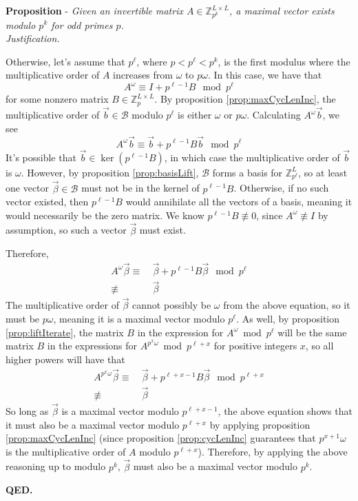 \documentclass[a4paper, 12pt, reqno]{amsart}
\newcounter{propcounter}
\newenvironment{proposition}[1]
{
	\refstepcounter{propcounter}
	\textbf{Proposition \thepropcounter} - \emph{#1} \\
	\emph{Justification.}
}
{
	\textbf{QED.} \\
}
\begin{document}
\begin{proposition}{Given an invertible matrix $A \in \mathds{Z}_{p^k}^{L \times L}$, a maximal vector exists modulo $p^k$ for odd primes $p$.}
			Otherwise, let's assume that $p^\ell$, where $p < p^\ell < p^k$, is the first modulus where the multiplicative order of $A$ increases from $\omega$ to 
			$p\omega$. In this case, we have that
			\[
				A^\omega \equiv I + p^{\ell-1}B \mod{p^\ell}
			\]
			for some nonzero matrix $B \in \mathds{Z}_p^{L \times L}$. By proposition \ref{prop:maxCycLenInc}, the multiplicative order of $\vec{b} \in \mathcal{B}$ modulo 
			$p^\ell$ is either $\omega$ or $p\omega$. Calculating $A^\omega\vec{b}$, we see
			\[
				A^\omega\vec{b} \equiv \vec{b} + p^{\ell-1}B\vec{b} \mod{p^\ell}
			\]
			It's possible that $\vec{b} \in \ker{(p^{\ell-1}B)}$, in which case the multiplicative order of $\vec{b}$ is $\omega$. However, by proposition 
			\ref{prop:basisLift}, $\mathcal{B}$ forms a basis for $\mathds{Z}_{p^\ell}^L$, so at least one vector $\vec{\beta} \in \mathcal{B}$ must not be in the kernel of $p^{\ell-1}B$. Otherwise, if no such vector 
			existed, then $p^{\ell-1}B$ would annihilate all the vectors of a basis, meaning it would necessarily be the zero matrix. We know $p^{\ell-1}B \not\equiv 0$, 
			since $A^\omega \not\equiv I$ by assumption, so such a vector $\vec{\beta}$ must exist.
			
			Therefore,
			\begin{align*}
				A^\omega\vec{\beta} \equiv& \ \vec{\beta} + p^{\ell-1}B\vec{\beta} \mod{p^\ell} \\
				                \not\equiv& \ \vec{\beta}
			\end{align*}
			The multiplicative order of $\vec{\beta}$ cannot possibly be $\omega$ from the above equation, so it must be $p\omega$, meaning it is a maximal vector modulo 
			$p^\ell$. As well, by proposition \ref{prop:liftIterate}, the matrix $B$ in the expression for $A^\omega \bmod{p^\ell}$ will be the same matrix $B$ in the 
			expressions for $A^{p^x\omega} \bmod{p^{\ell+x}}$ for positive integers $x$, so all higher powers will have that
			\begin{align*}
				A^{p^x\omega}\vec{\beta} \equiv& \ \vec{\beta} + p^{\ell+x-1}B\vec{\beta} \mod{p^{\ell+x}} \\
				                     \not\equiv& \ \vec{\beta}
			\end{align*}
			So long as $\vec{\beta}$ is a maximal vector modulo $p^{\ell+x-1}$, the above equation shows that it must also be a maximal vector modulo $p^{\ell+x}$ by 
			applying proposition \ref{prop:maxCycLenInc} (since proposition \ref{prop:cycLenInc} guarantees that $p^{x+1}\omega$ is the multiplicative order of $A$ modulo 
			$p^{\ell+x}$). Therefore, by applying the above reasoning up to modulo $p^k$, $\vec{\beta}$ must also be a maximal vector modulo $p^k$.
		\end{proposition}
	
	
	
\end{document}
